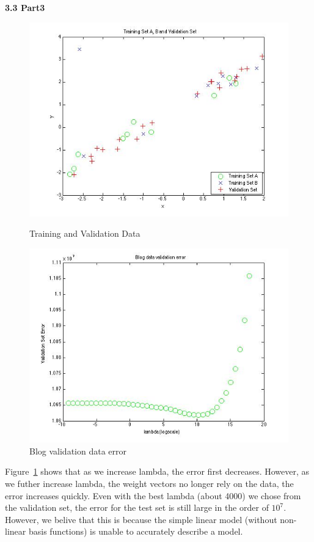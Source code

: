 {\bfseries 3.3 Part3}
\begin{figure}[!htb]
  \includegraphics[width=\linewidth]{figures/p3_training_validation_data}
  \caption{Training and Validation Data}\label{fig:p3_training_validation_data}
  \endminipage\hfill
  \includegraphics[width=\linewidth]{figures/p3_blogdata_lambda}
  \caption{Blog validation data error}\label{fig:p3_blog_data}
  \endminipage\hfill
\end{figure}

Figure~\ref{fig:p3_blog_data} shows that as we increase lambda, the error first decreases. However, as we futher increase lambda, the weight vectors no longer rely on the data, the error increases quickly. Even with the best lambda (about 4000) we chose from the validation set, the error for the test set is still large in the order of $10^{7}$. However, we belive that this is because the simple linear model (without non-linear basis functions) is unable to accurately describe a model. 
